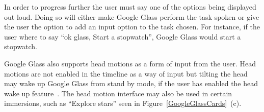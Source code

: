 In order to progress further the user must say one of the options being displayed out loud. Doing so will either make Google Glass perform the task spoken or give the user the option to add an input option to the task chosen. For instance, if the user where to say ``ok glass, Start a stopwatch'', Google Glass would start a stopwatch.

Google Glass also supports head motions as a form of input from the user. Head motions are not enabled in the timeline as a way of input but tilting the head may wake up Google Glass from stand by mode, if the user has enabled the head wake up feature~\cite{headWakeUp}. The head motion interface may also be used in certain immersions, such as ``Explore stars'' seen in Figure~\ref{GoogleGlassCards}~(c).




